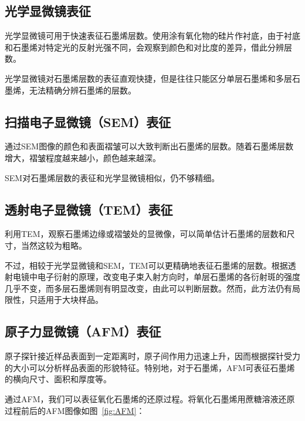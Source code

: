 \subsection{光学显微镜表征}

光学显微镜可用于快速表征石墨烯层数。使用涂有氧化物的硅片作衬底，由于衬底和石墨烯对特定光的反射光强不同，会观察到颜色和对比度的差异，借此分辨层数\cite{RN12}。

光学显微镜对石墨烯层数的表征直观快捷，但是往往只能区分单层石墨烯和多层石墨烯，无法精确分辨石墨烯的层数。

\subsection{扫描电子显微镜（SEM）表征}

通过SEM图像的颜色和表面褶皱可以大致判断出石墨烯的层数。随着石墨烯层数增大，褶皱程度越来越小，颜色越来越深。

SEM对石墨烯层数的表征和光学显微镜相似，仍不够精细。

\subsection{透射电子显微镜（TEM）表征}

利用TEM，观察石墨烯边缘或褶皱处的显微像，可以简单估计石墨烯的层数和尺寸，当然这较为粗略。

不过，相较于光学显微镜和SEM，TEM可以更精确地表征石墨烯的层数。根据透射电镜中电子衍射的原理，改变电子束入射方向时，单层石墨烯的各衍射斑的强度几乎不变，而多层石墨烯则有明显改变，由此可以判断层数\cite{RN12}。然而，此方法仍有局限性，只适用于大块样品。

\subsection{原子力显微镜（AFM）表征}

原子探针接近样品表面到一定距离时，原子间作用力迅速上升，因而根据探针受力的大小可以分析样品表面的形貌特征。特别地，对于石墨烯，AFM可表征石墨烯的横向尺寸、面积和厚度等。

通过AFM，我们可以表征氧化石墨烯的还原过程。将氧化石墨烯用蔗糖溶液还原过程前后的AFM图像如图~\ref{fig:AFM}\cite{RN13}：

